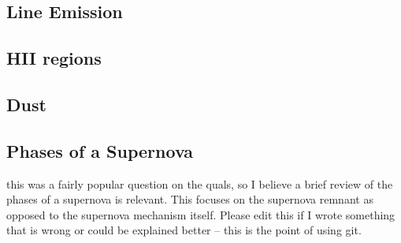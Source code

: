 \subsection{Line Emission}

\subsection{HII regions}

\subsection{Dust}

\subsection{Phases of a Supernova}
 this was a fairly popular question on the quals, so
I believe a brief review of the phases of a supernova is relevant.  This focuses on the
supernova remnant as opposed to the supernova mechanism itself.  Please edit this if I wrote
something that is wrong or could be explained better -- this is the point of using git.
